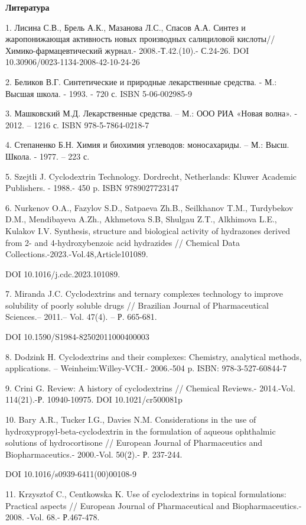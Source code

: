 {\bfseries Литература}

1. Лисина С.В., Брель А.К., Мазанова Л.С., Спасов А.А. Синтез и
жаропонижающая активность новых производных салициловой
кислоты//Химико-фармацевтический журнал.- 2008.-Т.42.(10).- С.24-26. DOI
10.30906/0023-1134-2008-42-10-24-26

2. Беликов В.Г. Синтетические и природные лекарственные средства. - М.:
Высшая школа. - 1993. - 720 с. ISBN 5-06-002985-9

3. Машковский М.Д. Лекарственные средства. -- М.: ООО РИА «Новая волна».
- 2012. -- 1216 с. ISBN 978-5-7864-0218-7

4. Степаненко Б.Н. Химия и биохимия углеводов: моносахариды. -- М.:
Высш. Школа. - 1977. -- 223 с.

5. Szejtli J. Cyclodextrin Technology. Dordrecht, Netherlands: Kluwer
Academic Publishers. - 1988.- 450 p. ISBN 9789027723147

6. Nurkenov O.A., Fazylov S.D., Satpaeva Zh.B., Seilkhanov T.M.,
Turdybekov D.M., Mendibayeva A.Zh., Akhmetova S.B, Shulgau Z.T.,
Alkhimova L.E., Kulakov I.V. Synthesis, structure and biological
activity of hydrazones derived from 2- and 4-hydroxybenzoic acid
hydrazides // Chemical Data Collections.-2023.-Vol.48,Article101089.

DOI 10.1016/j.cdc.2023.101089.

7. Miranda J.C. Cyclodextrins and ternary complexes technology to
improve solubility of poorly soluble drugs // Brazilian Journal of
Pharmaceutical Sciences.-- 2011.-- Vol. 47(4). -- Р. 665-681.

DOI 10.1590/S1984-82502011000400003

8. Dodzink H. Cyclodextrins and their complexes: Chemistry, analytical
methods, applications. -- Weinheim:Willey-VCH.- 2006.-504 p. ISBN:
978-3-527-60844-7

9. Crini G. Review: A history of cyclodextrins // Chemical Reviews.-
2014.-Vol. 114(21).-Р. 10940-10975. DOI 10.1021/cr500081p

10. Bary A.R., Tucker I.G., Davies N.M. Considerations in the use of
hydroxypropyl-beta-cyclodextrin in the formulation of aqueous ophthalmic
solutions of hydrocortisone // European Journal of Pharmaceutics and
Biopharmaceutics.- 2000.-Vol. 50(2).- Р. 237-244.

DOI 10.1016/s0939-6411(00)00108-9

11. Krzysztof C., Centkowska K. Use of cyclodextrins in topical
formulations: Practical aspects // European Journal of Pharmaceutical
and Biopharmaceutics.- 2008. -Vol. 68.- Р.467-478.

